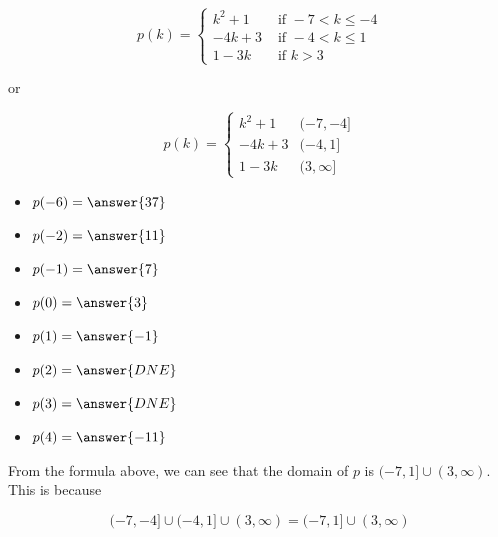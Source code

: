 \documentclass{ximera}
\begin{document}
\begin{question}

\[
p(k) = 
\begin{cases}
  k^2 + 1 & \text{ if } -7 < k \leq -4 \\
  -4k + 3 & \text{ if } -4 < k \leq 1 \\
  1 - 3k & \text{ if } k > 3
\end{cases}
\]


or


\[
p(k) = 
\begin{cases}
  k^2 + 1 & (-7, -4] \\
  -4k + 3 & (-4, 1] \\
  1 - 3k & (3, \infty]
\end{cases}
\]



\begin{itemize}
\item $p(-6) = \answer{37}$  
\item $p(-2) = \answer{11}$ 
\item $p(-1) = \answer{7}$ 
\item $p(0) = \answer{3}$ 
\item $p(1) = \answer{-1}$ 
\item $p(2) = \answer{DNE}$ 
\item $p(3) = \answer{DNE}$ 
\item $p(4) = \answer{-11}$ 
\end{itemize}

\end{question}



From the formula above, we can see that the domain of $p$ is $(-7, 1] \cup (3, \infty)$. \\

This is because


\[
(-7, -4] \cup (-4, 1] \cup (3, \infty) = (-7, 1] \cup (3, \infty)
\]
\end{document}
